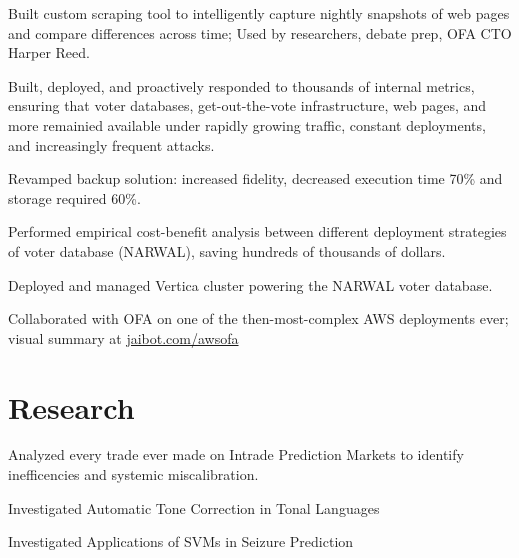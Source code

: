 \documentclass[]{resume}
\begin{document}
\begin{minipage}[t]{0.66\textwidth}
\descript{}
\begin{tightemize}
\item Built custom scraping tool to intelligently capture nightly snapshots of web pages and compare differences across time; Used by researchers, debate prep, OFA CTO Harper Reed.
\item Built, deployed, and proactively responded to thousands of internal metrics, ensuring that voter databases, get-out-the-vote infrastructure, web pages, and more remainied available under rapidly growing traffic, constant deployments, and increasingly frequent attacks.
\item Revamped backup solution: increased fidelity, decreased execution time 70\% and storage required 60\%.
\item Performed empirical cost-benefit analysis between different deployment strategies of voter database (NARWAL), saving hundreds of thousands of dollars.
\item Deployed and managed Vertica cluster powering the NARWAL voter database.
\item Collaborated with OFA on one of the then-most-complex AWS deployments ever; visual summary at \href{http://www.jaibot.com/awsofa}{jaibot.com/awsofa}
\end{tightemize}
\sectionsep


\section{Research}

\sectionsep
{}
Analyzed every trade ever made on Intrade Prediction Markets to identify
inefficencies and systemic miscalibration.
\sectionsep

Investigated Automatic Tone Correction in Tonal Languages
\sectionsep

Investigated Applications of SVMs in Seizure Prediction
\sectionsep




\end{minipage}
\end{document}
